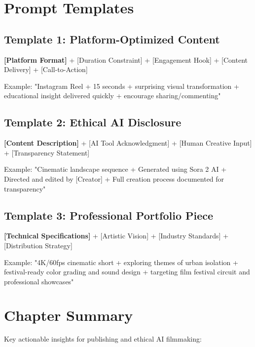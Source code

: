 \section*{Prompt Templates}

\subsection*{Template 1: Platform-Optimized Content}
\begin{Prompt}
\textbf{[Platform Format]} + [Duration Constraint] + [Engagement Hook] + [Content Delivery] + [Call-to-Action]

Example: "Instagram Reel + 15 seconds + surprising visual transformation + educational insight delivered quickly + encourage sharing/commenting"
\end{Prompt}

\subsection*{Template 2: Ethical AI Disclosure}
\begin{Prompt}
\textbf{[Content Description]} + [AI Tool Acknowledgment] + [Human Creative Input] + [Transparency Statement]

Example: "Cinematic landscape sequence + Generated using Sora 2 AI + Directed and edited by [Creator] + Full creation process documented for transparency"
\end{Prompt}

\subsection*{Template 3: Professional Portfolio Piece}
\begin{Prompt}
\textbf{[Technical Specifications]} + [Artistic Vision] + [Industry Standards] + [Distribution Strategy]

Example: "4K/60fps cinematic short + exploring themes of urban isolation + festival-ready color grading and sound design + targeting film festival circuit and professional showcases"
\end{Prompt}

\section*{Chapter Summary}

Key actionable insights for publishing and ethical AI filmmaking:

